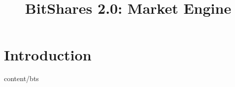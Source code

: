 \documentclass{btswhitepaper}
\title{BitShares 2.0: Market Engine}
\begin{document}
\maketitle

\begin{abstract}%
\end{abstract}

\section       { Introduction                      }  { content/bts                 } 



\end{document}
